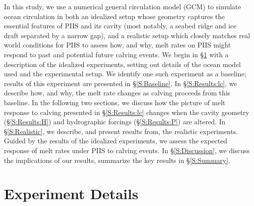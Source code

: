 \documentclass[draft]{agujournal2019}
\begin{document}
In this study, we use a numerical general circulation model (GCM) to simulate ocean circulation in both an idealized setup whose geometry captures the essential features of PIIS and its cavity (most notably, a seabed ridge and ice draft separated by a narrow gap), and a realistic setup which closely matches real world conditions for PIIS to assess how, and why, melt rates on PIIS might respond to past and potential future calving events. We begin in \S\ref{S:Experiment} with a description of the idealized experiments, setting out details of the ocean model used and the experimental setup. We identify one such experiment as a baseline;  results of this experiment are presented in \S\ref{S:Baseline}. In \S\ref{S:Results:lc}, we describe how, and why, the melt rate changes as calving proceeds from this baseline. In the following two sections, we discuss how the picture of melt response to calving presented in \S\ref{S:Results:lc} changes when the cavity geometry (\S\ref{S:Results:H}) and hydrographic forcings (\S\ref{S:Results:P}) are altered. In \S\ref{S:Realistic}, we describe, and present results from, the realistic experiments. Guided by the results of the idealized experiments, we assess the expected response of melt rates under PIIS to calving events. In \S\ref{S:Discussion}, we discuss the implications of our results, summarize the key results in \S\ref{S:Summary}.


\section{Experiment Details}\label{S:Experiment}
\end{document}
